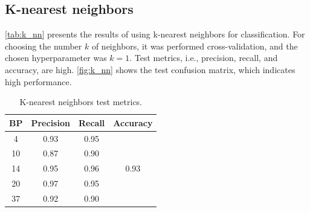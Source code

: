 \documentclass[twocolumn]{article}
\begin{document}
            \subsection{K-nearest neighbors}

                  \autoref{tab:k_nn} presents the results of using k-nearest neighbors for classification. For choosing the number $k$ of neighbors, it was performed cross-validation, and the chosen hyperparameter was $k = 1$. Test metrics, i.e., precision, recall, and accuracy, are high. \autoref{fig:k_nn} shows the test confusion matrix, which indicates high performance.
                  
                  \begin{table}[H]
                        \centering
                        \caption{K-nearest neighbors test metrics.}
                        \label{tab:k_nn}
                        \begin{tabular}{c|cc|c}
                        BP & Precision & Recall & Accuracy              \\ \hline
                        4  & 0.93      & 0.95   & \multirow{5}{*}{0.93} \\
                        10 & 0.87      & 0.90   &                       \\
                        14 & 0.95      & 0.96   &                       \\
                        20 & 0.97      & 0.95   &                       \\
                        37 & 0.92      & 0.90   &                      
                        \end{tabular}
                  \end{table}
\end{document}
